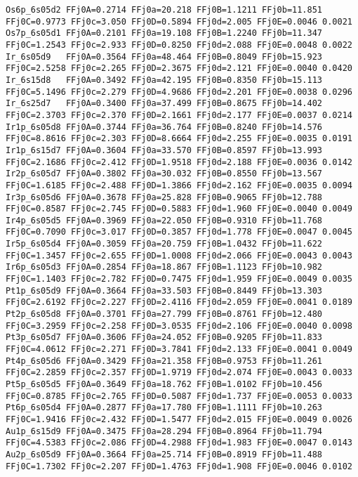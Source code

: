 {\begin{verbatim}
Os6p_6s05d2 FFj0A=0.2714 FFj0a=20.218 FFj0B=1.1211 FFj0b=11.851 FFj0C=0.9773 FFj0c=3.050 FFj0D=0.5894 FFj0d=2.005 FFj0E=0.0046 0.0021
Os7p_6s05d1 FFj0A=0.2101 FFj0a=19.108 FFj0B=1.2240 FFj0b=11.347 FFj0C=1.2543 FFj0c=2.933 FFj0D=0.8250 FFj0d=2.088 FFj0E=0.0048 0.0022
Ir_6s05d9   FFj0A=0.3564 FFj0a=48.464 FFj0B=0.8049 FFj0b=15.923 FFj0C=2.5258 FFj0c=2.265 FFj0D=2.3675 FFj0d=2.121 FFj0E=0.0040 0.0420
Ir_6s15d8   FFj0A=0.3492 FFj0a=42.195 FFj0B=0.8350 FFj0b=15.113 FFj0C=5.1496 FFj0c=2.279 FFj0D=4.9686 FFj0d=2.201 FFj0E=0.0038 0.0296
Ir_6s25d7   FFj0A=0.3400 FFj0a=37.499 FFj0B=0.8675 FFj0b=14.402 FFj0C=2.3703 FFj0c=2.370 FFj0D=2.1661 FFj0d=2.177 FFj0E=0.0037 0.0214
Ir1p_6s05d8 FFj0A=0.3744 FFj0a=36.764 FFj0B=0.8240 FFj0b=14.576 FFj0C=8.8616 FFj0c=2.303 FFj0D=8.6664 FFj0d=2.255 FFj0E=0.0035 0.0191
Ir1p_6s15d7 FFj0A=0.3604 FFj0a=33.570 FFj0B=0.8597 FFj0b=13.993 FFj0C=2.1686 FFj0c=2.412 FFj0D=1.9518 FFj0d=2.188 FFj0E=0.0036 0.0142
Ir2p_6s05d7 FFj0A=0.3802 FFj0a=30.032 FFj0B=0.8550 FFj0b=13.567 FFj0C=1.6185 FFj0c=2.488 FFj0D=1.3866 FFj0d=2.162 FFj0E=0.0035 0.0094
Ir3p_6s05d6 FFj0A=0.3678 FFj0a=25.828 FFj0B=0.9065 FFj0b=12.788 FFj0C=0.8587 FFj0c=2.745 FFj0D=0.5883 FFj0d=1.960 FFj0E=0.0040 0.0049
Ir4p_6s05d5 FFj0A=0.3969 FFj0a=22.050 FFj0B=0.9310 FFj0b=11.768 FFj0C=0.7090 FFj0c=3.017 FFj0D=0.3857 FFj0d=1.778 FFj0E=0.0047 0.0045
Ir5p_6s05d4 FFj0A=0.3059 FFj0a=20.759 FFj0B=1.0432 FFj0b=11.622 FFj0C=1.3457 FFj0c=2.655 FFj0D=1.0008 FFj0d=2.066 FFj0E=0.0043 0.0043
Ir6p_6s05d3 FFj0A=0.2854 FFj0a=18.867 FFj0B=1.1123 FFj0b=10.982 FFj0C=1.1403 FFj0c=2.782 FFj0D=0.7475 FFj0d=1.959 FFj0E=0.0049 0.0035
Pt1p_6s05d9 FFj0A=0.3664 FFj0a=33.503 FFj0B=0.8449 FFj0b=13.303 FFj0C=2.6192 FFj0c=2.227 FFj0D=2.4116 FFj0d=2.059 FFj0E=0.0041 0.0189
Pt2p_6s05d8 FFj0A=0.3701 FFj0a=27.799 FFj0B=0.8761 FFj0b=12.480 FFj0C=3.2959 FFj0c=2.258 FFj0D=3.0535 FFj0d=2.106 FFj0E=0.0040 0.0098
Pt3p_6s05d7 FFj0A=0.3606 FFj0a=24.052 FFj0B=0.9205 FFj0b=11.833 FFj0C=4.0612 FFj0c=2.271 FFj0D=3.7841 FFj0d=2.133 FFj0E=0.0041 0.0049
Pt4p_6s05d6 FFj0A=0.3429 FFj0a=21.358 FFj0B=0.9753 FFj0b=11.261 FFj0C=2.2859 FFj0c=2.357 FFj0D=1.9719 FFj0d=2.074 FFj0E=0.0043 0.0033
Pt5p_6s05d5 FFj0A=0.3649 FFj0a=18.762 FFj0B=1.0102 FFj0b=10.456 FFj0C=0.8785 FFj0c=2.765 FFj0D=0.5087 FFj0d=1.737 FFj0E=0.0053 0.0033
Pt6p_6s05d4 FFj0A=0.2877 FFj0a=17.780 FFj0B=1.1111 FFj0b=10.263 FFj0C=1.9416 FFj0c=2.432 FFj0D=1.5477 FFj0d=2.015 FFj0E=0.0049 0.0026
Au1p_6s15d9 FFj0A=0.3475 FFj0a=28.294 FFj0B=0.8964 FFj0b=11.794 FFj0C=4.5383 FFj0c=2.086 FFj0D=4.2988 FFj0d=1.983 FFj0E=0.0047 0.0143
Au2p_6s05d9 FFj0A=0.3664 FFj0a=25.714 FFj0B=0.8919 FFj0b=11.488 FFj0C=1.7302 FFj0c=2.207 FFj0D=1.4763 FFj0d=1.908 FFj0E=0.0046 0.0102

\end{verbatim}}
